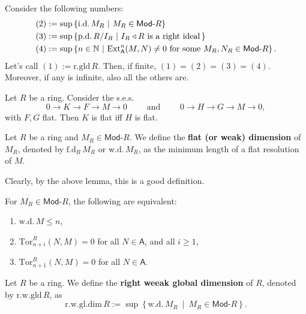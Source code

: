 \begin{thm}
	Consider the following numbers:
	\begin{align}
		(2) &:= \sup \left\{ \mathrm{i.d.}\, M_R \ \middle|\ M_R \in \mathsf{Mod}\text{-}R \right\}\\
		(3) &:= \sup \left\{ \mathrm{p.d.}\, R/I_R \ \middle|\ I_R \triangleleft R 
		\text{ is a right ideal}\, \right\}\\
		(4) &:= \sup \left\{n \in \N \ \middle|\ \mathrm{Ext}^n_{\mathsf{A}}(M,N) \neq 0
		\text{ for some } M_R, N_R \in \mathsf{Mod}\text{-}R \right\}
	.\end{align} 
	Let's call $(1) := \mathrm{r.gld}\, R$.
	Then, if finite, $(1) = (2) = (3) = (4)$.
	Moreover, if any is infinite, also all the others are.
\end{thm}

\begin{lem}
	Let $R$ be a ring.
	Consider the s.e.s.
	\begin{equation}
	0 \to K \to F \to M \to 0
	\qquad \text{ and } \qquad
	0 \to H \to G \to M \to 0
	,\end{equation} 
	with $F, G$ flat.
	Then $K$ is flat iff $H$ is flat.
\end{lem} 

\begin{defn}
	Let $R$ be a ring and $M_R \in \mathsf{Mod}\text{-}R$.
	We define the \textbf{flat (or weak) dimension} of $M_R$,
	denoted by $\mathrm{f.d}_R\, M_R$ or $\mathrm{w.d.}\, M_R$,
	as the minimum length of a flat resolution of $M$.
\end{defn}
\begin{rem}[]
	Clearly, by the above lemma, this is a good definition.
\end{rem}

\begin{prop}
	For $M_R \in \mathsf{Mod}\text{-}R$, the following are equivalent:
	\begin{enumerate}
		\item $\mathrm{w.d.}\, M \leq n$,
		\item $\mathrm{Tor}_{n+i}^R (N,M) = 0$ for all $N \in \mathsf{A}$, and all $i \geq 1$,
		\item $\mathrm{Tor}_{n+1}^R (N,M) = 0$ for all $N \in \mathsf{A}$.
	\end{enumerate}
\end{prop} 

\begin{defn}
	Let $R$ be a ring.
	We define the \textbf{right weeak global dimension} of $R$,
	denoted by $\mathrm{r.w.gld}\, R$,
	as
	\begin{equation}
	\mathrm{r.w.gl.dim}\, R := \sup \left\{ \mathrm{w.d.}\, M_R \ \middle|\ M_R \in \mathsf{Mod}\text{-}R \right\}
	.\end{equation} 
\end{defn}

